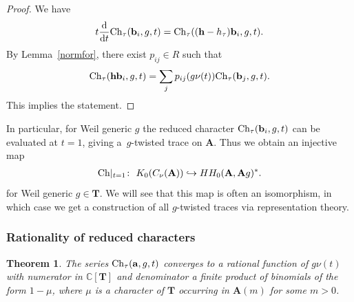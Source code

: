 \documentclass[pdftex]{sigma}
\numberwithin{equation}{section}
\newtheorem{Theorem}{Theorem}[section]
\begin{document}
\begin{proof} We have
\begin{gather*}
t\frac{{\rm d}}{{\rm d}t}{\rm Ch}_\tau({\mathbf b}_i,g,t)={\rm Ch}_\tau(({\mathbf{h}}-h_\tau){\mathbf b}_i,g,t).
\end{gather*}
By Lemma~\ref{normfor}, there exist $p_{ij}\in R$ such that
\begin{gather*}
{\rm Ch}_\tau({\mathbf{h}}{\mathbf b}_i,g,t)=\sum_j p_{ij}(g\nu(t)) {\rm Ch}_\tau({\mathbf b}_j,g,t).
\end{gather*}
This implies the statement.
\end{proof}

In particular, for Weil generic $g$ the reduced character ${\rm Ch}_\tau({\mathbf b}_i,g,t)$ can be evaluated at $t=1$, giving a~$g$-twisted trace on ${\mathbf A}$. Thus we obtain an injective map
\begin{gather*}
{\rm Ch}|_{t=1}\colon \ K_0(C_\nu({\mathbf A}))\hookrightarrow HH_0({\mathbf A},{\mathbf A} g)^*.
\end{gather*}
for Weil generic $g\in {\mathbf T}$. We will see that this map is often an isomorphism, in which case we get a construction of all $g$-twisted traces via representation theory.

\subsubsection{Rationality of reduced characters}

\begin{Theorem}\label{ratfun} The series ${\rm Ch}_\tau({\mathbf a},g,t)$ converges to a rational function of $g\nu(t)$ with numerator in ${\mathbb C}[{\mathbf T}]$ and denominator a finite product of binomials of the form $1-\mu$, where $\mu$ is a character of ${\mathbf T}$ occurring in ${\mathbf A}(m)$ for some $m>0$.
\end{Theorem}
\end{document}
